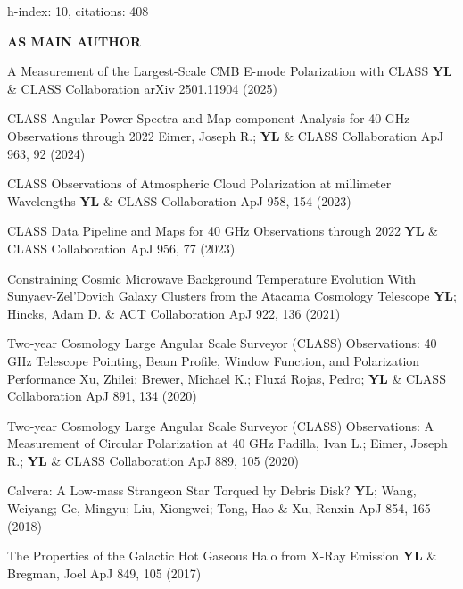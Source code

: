 \hfill\textmd{h-index: 10, citations: 408}
\begin{footnotesize}
    \textsf{\textbf{ AS MAIN AUTHOR }}
\end{footnotesize}
\begin{etaremune}[topsep=0pt,itemsep=0pt,partopsep=0pt,parsep=0pt]
    \renewcommand\labelenumi{\footnotesize\bfseries\theenumi.}
    
            {A Measurement of the Largest-Scale CMB E-mode Polarization with CLASS}
            {\textbf{YL} \& CLASS Collaboration}
            {arXiv 2501.11904 (2025)}
    
            {CLASS Angular Power Spectra and Map-component Analysis for 40 GHz Observations through 2022}
            {Eimer, Joseph R.; \textbf{YL} \& CLASS Collaboration}
            {ApJ 963, 92 (2024)}
    
            {CLASS Observations of Atmospheric Cloud Polarization at millimeter Wavelengths}
            {\textbf{YL} \& CLASS Collaboration}
            {ApJ 958, 154 (2023)}
    
            {CLASS Data Pipeline and Maps for 40 GHz Observations through 2022}
            {\textbf{YL} \& CLASS Collaboration}
            {ApJ 956, 77 (2023)}
    
            {Constraining Cosmic Microwave Background Temperature Evolution With Sunyaev-Zel'Dovich Galaxy Clusters from the Atacama Cosmology Telescope}
            {\textbf{YL}; Hincks, Adam D. \& ACT Collaboration}
            {ApJ 922, 136 (2021)}
    
            {Two-year Cosmology Large Angular Scale Surveyor (CLASS) Observations: 40 GHz Telescope Pointing, Beam Profile, Window Function, and Polarization Performance}
            {Xu, Zhilei; Brewer, Michael K.; Fluxá Rojas, Pedro; \textbf{YL} \& CLASS Collaboration}
            {ApJ 891, 134 (2020)}
    
            {Two-year Cosmology Large Angular Scale Surveyor (CLASS) Observations: A Measurement of Circular Polarization at 40 GHz}
            {Padilla, Ivan L.; Eimer, Joseph R.; \textbf{YL} \& CLASS Collaboration}
            {ApJ 889, 105 (2020)}
    
            {Calvera: A Low-mass Strangeon Star Torqued by Debris Disk?}
            {\textbf{YL}; Wang, Weiyang; Ge, Mingyu; Liu, Xiongwei; Tong, Hao \& Xu, Renxin}
            {ApJ 854, 165 (2018)}
    
            {The Properties of the Galactic Hot Gaseous Halo from X-Ray Emission}
            {\textbf{YL} \& Bregman, Joel}
            {ApJ 849, 105 (2017)}
    
\end{etaremune}
